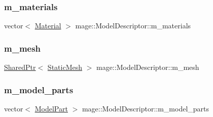 \subsubsection{\texorpdfstring{m\+\_\+materials}{m\_materials}}
{\footnotesize\ttfamily vector$<$ \hyperlink{structmage_1_1_material}{Material} $>$ mage\+::\+Model\+Descriptor\+::m\+\_\+materials\hspace{0.3cm}{\ttfamily [private]}}

\hypertarget{classmage_1_1_model_descriptor_ac3935d5b0738860809a770403ed07480}{}\label{classmage_1_1_model_descriptor_ac3935d5b0738860809a770403ed07480} 
\subsubsection{\texorpdfstring{m\+\_\+mesh}{m\_mesh}}
{\footnotesize\ttfamily \hyperlink{namespacemage_a1e01ae66713838a7a67d30e44c67703e}{Shared\+Ptr}$<$ \hyperlink{classmage_1_1_static_mesh}{Static\+Mesh} $>$ mage\+::\+Model\+Descriptor\+::m\+\_\+mesh\hspace{0.3cm}{\ttfamily [private]}}

\hypertarget{classmage_1_1_model_descriptor_a200c6e44c9b6a5bde5c8490fb93ba00f}{}\label{classmage_1_1_model_descriptor_a200c6e44c9b6a5bde5c8490fb93ba00f} 
\subsubsection{\texorpdfstring{m\+\_\+model\+\_\+parts}{m\_model\_parts}}
{\footnotesize\ttfamily vector$<$ \hyperlink{structmage_1_1_model_part}{Model\+Part} $>$ mage\+::\+Model\+Descriptor\+::m\+\_\+model\+\_\+parts\hspace{0.3cm}{\ttfamily [private]}}

